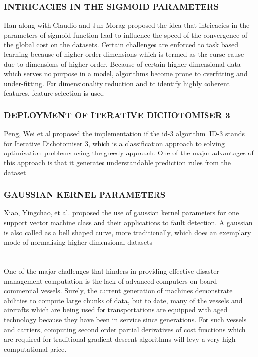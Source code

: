 \documentclass[12pt]{article}
\newcommand{\secsize}{\fontsize{15pt}{12pt}\selectfont}
\begin{document}
\subsubsection{\textbf{INTRICACIES IN THE SIGMOID PARAMETERS}}
Han along with Claudio and Jun Morag  proposed the idea that intricacies in the parameters of sigmoid function lead to influence the speed of the convergence of the global cost on the datasets. Certain challenges are enforced to task based learning because of higher order dimensions which is termed as the curse cause due to dimensions of higher order. Because of certain higher dimensional data which serves no purpose in a model, algorithms become prone to overfitting and under-fitting. For dimensionality reduction and to identify highly coherent features, feature selection is used 

\subsubsection{\textbf{DEPLOYMENT OF ITERATIVE DICHOTOMISER 3}}
Peng, Wei et al proposed the implementation if the id-3 algorithm. ID-3 stands for Iterative Dichotomiser 3, which is a classification approach to solving optimisation problems using the greedy approach. One of the major advantages of this approach is that it generates understandable prediction rules from the dataset

\subsubsection{\textbf{GAUSSIAN KERNEL PARAMETERS}}
Xiao, Yingchao, et al. proposed the use of gaussian kernel parameters for one support vector machine class and their applications to fault detection. A gaussian is also called as a bell shaped curve, more traditionally, which does an exemplary mode of normalising higher dimensional datasets

\newpage 

\section{\textbf{\secsize{PROBLEM IDENTIFICATION}}}
One of the major challenges that hinders in providing effective disaster management computation is the lack of advanced computers on board commercial vessels. Surely, the current generation of machines demonstrate abilities to compute large chunks of data, but to date, many of the vessels and aircrafts which are being used for transportations are equipped with aged technology because they have been in service since generations. For such vessels and carriers, computing second order partial derivatives of cost functions which are required for traditional gradient descent algorithms will levy a very high computational price. 
\end{document}

